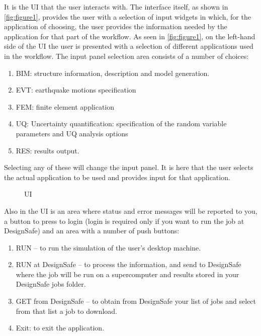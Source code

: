 
It is the UI that the user interacts with. The interface itself, as
shown in \autoref{fig:figure1}, provides the user with a selection of
input widgets in which, for the application of choosing, the user
provides the information needed by the application for that part of
the workflow.  As seen in \autoref{fig:figure1}, on the left-hand side
of the UI the user is presented with a selection of different
applications used in the workflow.  The input panel selection area
consists of a number of choices:

\begin{enumerate}
  \item BIM: structure information, description and model generation.
  \item EVT: earthquake motions specification
  \item FEM: finite element application
  \item UQ: Uncertainty quantification: specification of the random
  variable parameters and UQ analysis options
  \item RES: results output.
\end{enumerate}

Selecting any of these will change the input panel. It is here that
the user selects the actual application to be used and provides input
for that application.

\begin{figure}[!htbp]
  \caption{UI}
  \label{fig:figure1}
\end{figure}

Also in the UI is an area where status and error messages will be
reported to you, a button to press to login (login is required only if
you want to run the job at DesignSafe) and an area with a number of
push buttons:
\begin{enumerate}
\item	RUN – to run the simulation of the user’s desktop machine.
\item	RUN at DesignSafe – to process the information, and send to DesignSafe where the job will be run on a supercomputer and results stored in your DesignSafe jobs folder.
\item	GET from DesignSafe – to obtain from DesignSafe your list of jobs and select from that list a job to download.
\item	Exit: to exit the application.
\end{enumerate}

